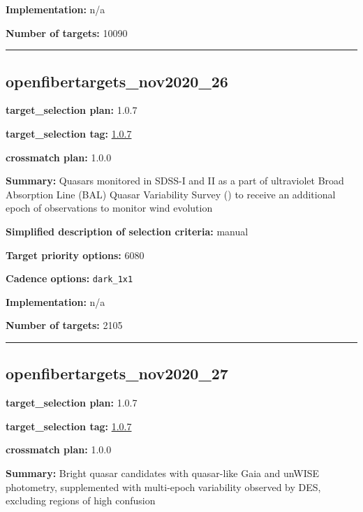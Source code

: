 \noindent\textbf{Implementation:} n/a

\noindent\textbf{Number of targets:} 10090

\begin{center}\rule{0.5\linewidth}{0.5pt}\end{center}

\hypertarget{openfibertargets_nov2020_26_plan1.0.7}{%
\subsection{openfibertargets\_nov2020\_26}\label{openfibertargets_nov2020_26_plan1.0.7}}

\noindent\textbf{target\_selection plan:} 1.0.7

\noindent\textbf{target\_selection tag:}
\href{https://github.com/sdss/target_selection/tree/1.0.7/}{1.0.7}

\noindent\textbf{crossmatch plan:} 1.0.0

\noindent\textbf{Summary:} Quasars monitored in SDSS-I and II as a part of
ultraviolet Broad Absorption Line (BAL) Quasar Variability Survey
(\citealt{Gibson2009}) to receive an additional epoch of observations to monitor
wind evolution

\noindent\textbf{Simplified description of selection criteria:} manual


\noindent\textbf{Target priority options:} 6080

\noindent\textbf{Cadence options:} \texttt{dark\_1x1}

\noindent\textbf{Implementation:} n/a

\noindent\textbf{Number of targets:} 2105

\begin{center}\rule{0.5\linewidth}{0.5pt}\end{center}

\hypertarget{openfibertargets_nov2020_27_plan1.0.7}{%
\subsection{openfibertargets\_nov2020\_27}\label{openfibertargets_nov2020_27_plan1.0.7}}

\noindent\textbf{target\_selection plan:} 1.0.7

\noindent\textbf{target\_selection tag:}
\href{https://github.com/sdss/target_selection/tree/1.0.7/}{1.0.7}

\noindent\textbf{crossmatch plan:} 1.0.0

\noindent\textbf{Summary:} Bright quasar candidates with quasar-like Gaia and
unWISE photometry, supplemented with multi-epoch variability observed by
DES, excluding regions of high confusion

